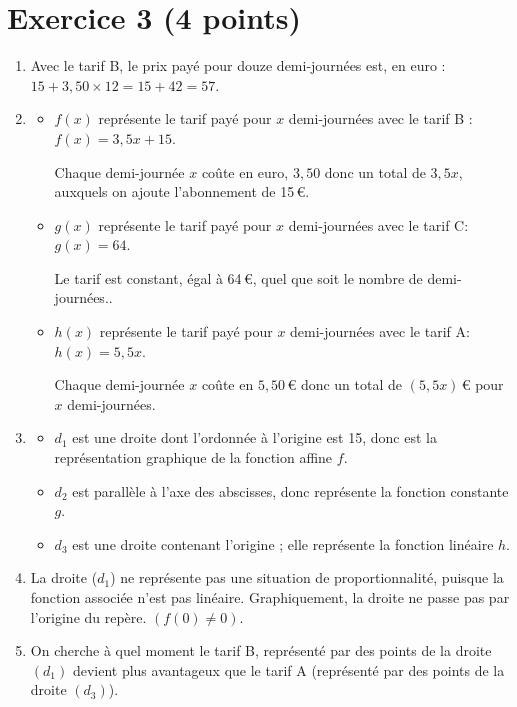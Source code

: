 \documentclass[12pt,a4paper,french]{article}
\begin{document}
\section*{Exercice 3 (4 points)}

\begin{enumerate}
	\item Avec le tarif B, le prix payé pour douze demi-journées est, en euro : \quad $15 + 3,50\times 12 = 15 + 42 = 57$.
	\item \begin{itemize}
		\item  $f(x)$ représente le tarif payé pour $x$ demi-journées avec le tarif B : $f(x) = 3,5x + 15.$

Chaque demi-journée $x$ coûte en euro, $3,50$ donc un total de $3,5x$, auxquels on ajoute l'abonnement de 15\,\euro{}.

	\item $g(x)$ représente le tarif payé pour $x$ demi-journées avec le tarif C: $g(x) = 64$.

Le tarif est constant, égal à 64\,\euro{}, quel que soit le nombre de demi-journées..

	\item $h(x)$ représente le tarif payé pour $x$ demi-journées avec le tarif A: $h(x)=5,5x$.

Chaque demi-journée $x$ coûte en $5,50\,\euro$ donc un total de $(5,5x)$\,\euro{} pour $x$ demi-journées.
	\end{itemize}


	\item \begin{itemize}
		\item  $d_1$ est une droite dont l'ordonnée à l'origine est 15, donc est la représentation graphique de la fonction affine $f$.
		\item $d_2$ est parallèle à l'axe des abscisses, donc représente la fonction constante $g$.
		\item $d_3$ est une droite contenant l'origine ; elle représente la fonction linéaire $h$.
	\end{itemize}
	\item La droite ($d_1$) ne représente pas une situation de proportionnalité, puisque la fonction associée n'est pas linéaire. Graphiquement, la droite ne passe pas par l'origine du repère. $(f(0) \ne 0)$.
	\item On cherche à quel moment le tarif B, représenté par des points de la droite $(d_1)$ devient plus avantageux que le tarif A (représenté par des points de la droite $(d_3)$).


\end{enumerate}
\end{document}
